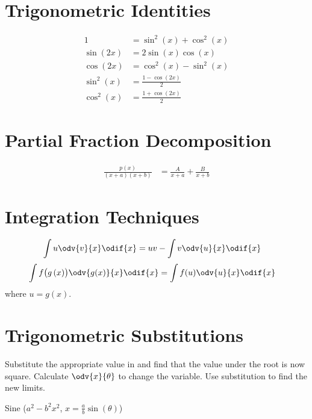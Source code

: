 \documentclass{article}
\begin{document}
\begin{multicols}{3}
    \section*{Trigonometric Identities}
    \begin{align*}
        1                        & = \sin^2{\left( x \right)} + \cos^2{\left( x \right)} \\
        \sin{\left( 2x \right)}  & = 2\sin{\left( x \right)}\cos{\left( x \right)}       \\
        \cos{\left( 2x \right)}  & = \cos^2{\left( x \right)} - \sin^2{\left( x \right)} \\
        \sin^2{\left( x \right)} & = \frac{1-\cos{\left( 2x \right)}}{2}                 \\
        \cos^2{\left( x \right)} & = \frac{1+\cos{\left( 2x \right)}}{2}
    \end{align*}
    \section*{Partial Fraction Decomposition}
    \begin{align*}
        \frac{p(x)}{(x+a)(x+b)} & = \frac{A}{x+a} + \frac{B}{x+b}
    \end{align*}
    \section*{Integration Techniques}
    \begin{align*}
        \int u \odv{v}{x}\odif{x} & = uv - \int v \odv{u}{x}\odif{x}
    \end{align*}
    \begin{align*}
        \int f\bigl(g\left( x \right)\bigr)\odv{g(x)}{x} \odif{x} & = \int f(u) \odv{u}{x}\odif{x}
    \end{align*}
    where \(u = g(x)\).
    \section*{Trigonometric Substitutions}
    Substitute the appropriate value in and find that the value under the root is now square.
    Calculate \(\odv{x}{\theta}\) to change the variable.
    Use substitution to find the new limits.

    Sine (\(a^2-b^2x^2\), \(x=\frac{a}{b}\sin{\left( \theta \right)}\))
    \begin{center}
    \end{center}


\end{multicols}
\end{document}
